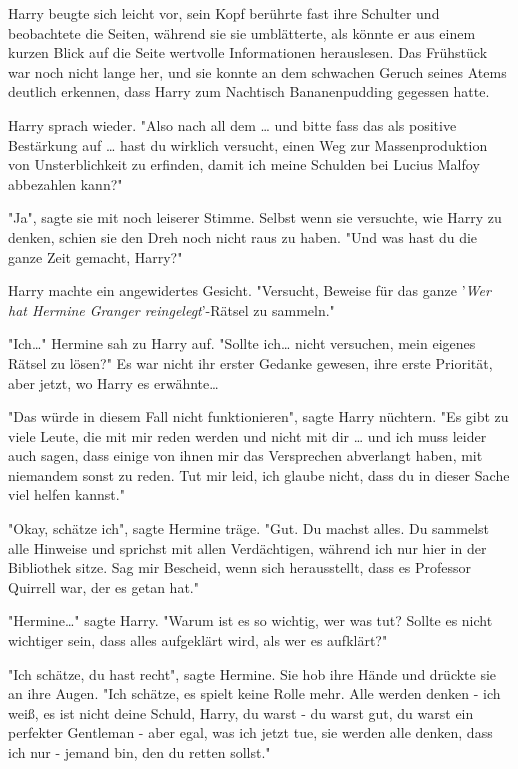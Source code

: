 {Harry beugte sich leicht vor, sein Kopf berührte fast ihre Schulter und beobachtete die Seiten, während sie sie umblätterte, als könnte er aus einem kurzen Blick auf die Seite wertvolle Informationen herauslesen. Das Frühstück war noch nicht lange her, und sie konnte an dem schwachen Geruch seines Atems deutlich erkennen, dass Harry zum Nachtisch Bananenpudding gegessen hatte.

Harry sprach wieder. "Also nach all dem … und bitte fass das als positive Bestärkung auf … hast du wirklich versucht, einen Weg zur Massenproduktion von Unsterblichkeit zu erfinden, damit ich meine Schulden bei Lucius Malfoy abbezahlen kann?"

"Ja", sagte sie mit noch leiserer Stimme. Selbst wenn sie versuchte, wie Harry zu denken, schien sie den Dreh noch nicht raus zu haben. "Und was hast du die ganze Zeit gemacht, Harry?"

Harry machte ein angewidertes Gesicht. "Versucht, Beweise für das ganze '\emph{Wer hat Hermine Granger reingelegt}'-Rätsel zu sammeln."

"Ich…" Hermine sah zu Harry auf. "Sollte ich… nicht versuchen, mein eigenes Rätsel zu lösen?" Es war nicht ihr erster Gedanke gewesen, ihre erste Priorität, aber jetzt, wo Harry es erwähnte…

"Das würde in diesem Fall nicht funktionieren", sagte Harry nüchtern. "Es gibt zu viele Leute, die mit mir reden werden und nicht mit dir … und ich muss leider auch sagen, dass einige von ihnen mir das Versprechen abverlangt haben, mit niemandem sonst zu reden. Tut mir leid, ich glaube nicht, dass du in dieser Sache viel helfen kannst."

"Okay, schätze ich", sagte Hermine träge. "Gut. Du machst alles. Du sammelst alle Hinweise und sprichst mit allen Verdächtigen, während ich nur hier in der Bibliothek sitze. Sag mir Bescheid, wenn sich herausstellt, dass es Professor Quirrell war, der es getan hat."

"Hermine…" sagte Harry. "Warum ist es so wichtig, wer was tut? Sollte es nicht wichtiger sein, dass alles aufgeklärt wird, als wer es aufklärt?"

"Ich schätze, du hast recht", sagte Hermine. Sie hob ihre Hände und drückte sie an ihre Augen. "Ich schätze, es spielt keine Rolle mehr. Alle werden denken - ich weiß, es ist nicht deine Schuld, Harry, du warst - du warst gut, du warst ein perfekter Gentleman - aber egal, was ich jetzt tue, sie werden alle denken, dass ich nur - jemand bin, den du retten sollst."

}
